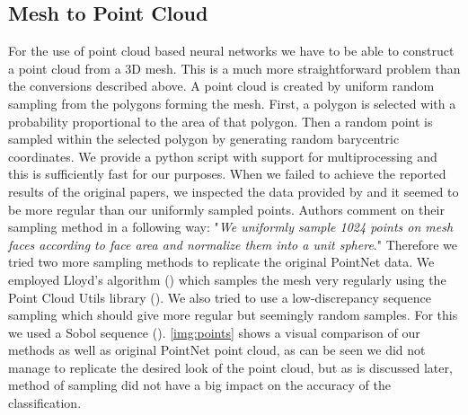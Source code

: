 \subsection{Mesh to Point Cloud}
\label{subsec:pointcloud}
For the use of point cloud based neural networks we have to be able to construct a point cloud from a 3D mesh. This is a much more straightforward problem than the conversions described above. A point cloud is created by uniform random sampling from the polygons forming the mesh. First, a polygon is selected with a probability proportional to the area of that polygon. Then a random point is sampled within the selected polygon by generating random barycentric coordinates. We provide a python script with support for multiprocessing and this is sufficiently fast for our purposes. When we failed to achieve the reported results of the original papers, we inspected the data provided by \cite{qi_pointnet_2016} and it seemed to be more regular than our uniformly sampled points. Authors comment on their sampling method in a following way: "\textit{We uniformly sample 1024 points on mesh faces according
to face area and normalize them into a unit sphere}." Therefore we tried two more sampling methods to replicate the original PointNet data. We employed Lloyd's algorithm (\cite{lloyd_least_1982}) which samples the mesh very regularly using the Point Cloud Utils library (\cite{williams_point_2019}). We also tried to use a low-discrepancy sequence sampling which should give more regular but seemingly random samples. For this we used a Sobol sequence (\cite{sobol_distribution_1967}). \autoref{img:points} shows a visual comparison of our methods as well as original PointNet point cloud, as can be seen we did not manage to replicate the desired look of the point cloud, but as is discussed later, method of sampling did not have a big impact on the accuracy of the classification.

